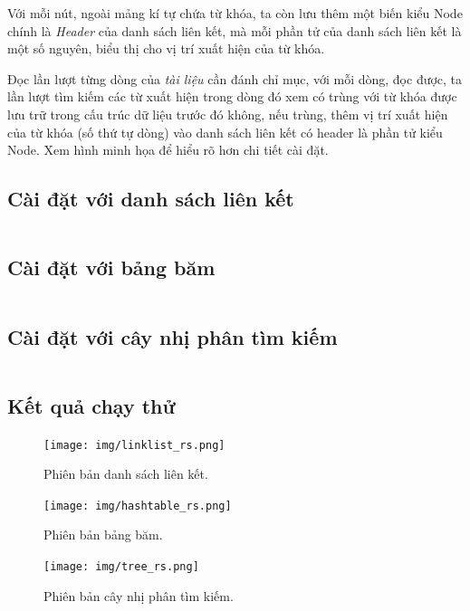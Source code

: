 \documentclass[a4paper,12pt]{report}
\newcommand{\mnt}[1]{\inputminted[frame=single, linenos=true, tabsize=4]{c++}{#1}}
\begin{document}
Với mỗi nút, ngoài mảng kí tự chứa từ khóa, ta còn lưu thêm một biến kiểu Node chính là \emph{Header} của danh sách liên kết, mà mỗi phần tử của danh sách liên kết là một số nguyên, biểu thị cho vị trí xuất hiện của từ khóa.

Đọc lần lượt từng dòng của \emph{tài liệu} cần đánh chỉ mục, với mỗi dòng, đọc được, ta lần lượt tìm kiếm các từ xuất hiện trong dòng đó xem có trùng với từ khóa được lưu trữ trong cấu trúc dữ liệu trước đó không, nếu trùng, thêm vị trí xuất hiện của từ khóa (số thứ tự dòng) vào danh sách liên kết có header là phần tử kiểu Node. Xem hình minh họa để hiểu rõ hơn chi tiết cài đặt.

\subsection{Cài đặt với danh sách liên kết}
\mnt{src/linkedlist.cpp}
\subsection{Cài đặt với bảng băm}
\mnt{src/hashtable.cpp}
\subsection{Cài đặt với cây nhị phân tìm kiếm}
\mnt{src/tree.cpp}
\subsection{Kết quả chạy thử}
\begin{figure}[htp]
\centering
\texttt{[image: img/linklist\_rs.png]}
\caption{Phiên bản danh sách liên kết.}
\label{}
\end{figure}

\begin{figure}[htp]
\centering
\texttt{[image: img/hashtable\_rs.png]}
\caption{Phiên bản bảng băm.}
\label{}
\end{figure}

\begin{figure}[htp]
\centering
\texttt{[image: img/tree\_rs.png]}
\caption{Phiên bản cây nhị phân tìm kiếm.}
\label{}
\end{figure}
\end{document}

